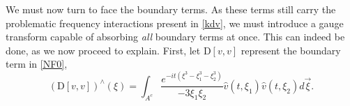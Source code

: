 \documentclass[%
11pt,  reqno]{amsart}
\newcommand{\5}{\textup{V}}
\theoremstyle{remark}
\newcommand{\R}{\mathbb{R}}
\numberwithin{equation}{section}
\numberwithin{theorem}{section}
\newcommand{\D}{\mathrm{D}}
\begin{document}
We must now turn to face the boundary terms. As these terms still carry the problematic frequency interactions present in \eqref{kdv}, we must introduce a gauge transform
    capable of absorbing \emph{all} boundary terms at once. This can indeed be done, as we now proceed to explain. First, let $\D[v,v]$ represent the  boundary term  in \eqref{NF0},
\begin{equation}
	(\D[v,v])^\wedge(\xi) =  \int_{A^c}\frac{e^{-it (\xi^3 -
			\xi_1^3 - \xi_2^3) }}{-3\xi_1\xi_2}  \widehat{v}(t, \xi_1) \widehat{v}(t,\xi_2) d\vec{\xi}.\label{eq:D_intro}
\end{equation}
    
\end{document}

